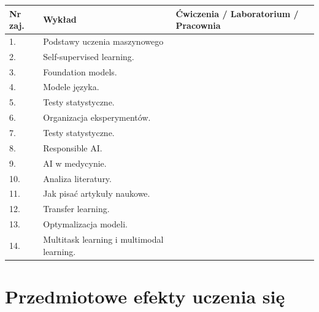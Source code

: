 \documentclass[12pt, a4paper]{article}
\begin{document}
\begin{longtable}{|p{1.5cm}|p{6.5cm}|p{6.5cm}|}
\hline
\textbf{Nr zaj.} & \textbf{Wykład} & \textbf{Ćwiczenia / Laboratorium / Pracownia} \\\hline
\endhead
  \hline
  1. & Podstawy uczenia maszynowego &  \\
  \hline
  2. & Self-supervised learning. &  \\
  \hline
  3. & Foundation models. &  \\
  \hline
  4. & Modele języka. &  \\
  \hline
  5. & Testy statystyczne. &  \\
  \hline
  6. & Organizacja eksperymentów. &  \\
  \hline
  7. & Testy statystyczne. &  \\
  \hline
  8. & Responsible AI. &  \\
  \hline
  9. & AI w medycynie. &  \\
  \hline
  10. & Analiza literatury. &  \\
  \hline
  11. & Jak pisać artykuły naukowe. &  \\
  \hline
  12. & Transfer learning. &  \\
  \hline
  13. & Optymalizacja modeli. &  \\
  \hline
  14. & Multitask learning i multimodal learning. &  \\
  \hline
\end{longtable}

\section{Przedmiotowe efekty uczenia się}
\end{document}
